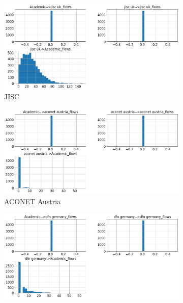 \documentclass[10pt, journal, letterpaper]{IEEEtran}
\newcommand\linearFigSze{0.48}
\newcommand\histFigSze{0.48}
\begin{document}
\begin{figure}
    \begin{subfigure}{\histFigSze\textwidth}
          \centering
          \includegraphics[width=\columnwidth]{img/jisc_hist_fps.png}
          \caption{JISC}
          \label{fig:jisc_hist_fps}
    \end{subfigure}
    \begin{subfigure}{\histFigSze\textwidth}
          \centering
          \includegraphics[width=\columnwidth]{img/aconet_hist_fps.png}
          \caption{ACONET Austria}
          \label{fig:aconet_hist_fps}
    \end{subfigure}
    \begin{subfigure}{\histFigSze\textwidth}
          \centering
          \includegraphics[width=\columnwidth]{img/dfn_hist_fps.png}

\end{subfigure}
\end{figure}
\end{document}
